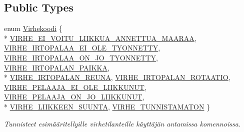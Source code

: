 \subsection*{Public Types}
\begin{DoxyCompactItemize}
\item 
enum \hyperlink{class_julkinen_1_1_toimintovirhe_a5b3c981a2e64a397ac982787bf310a2c}{Virhekoodi} \{ \\*
\hyperlink{class_julkinen_1_1_toimintovirhe_a5b3c981a2e64a397ac982787bf310a2ca4d1a26345955dbf92b867acd4a5f6e2d}{V\+I\+R\+H\+E\+\_\+\+E\+I\+\_\+\+V\+O\+I\+T\+U\+\_\+\+L\+I\+I\+K\+K\+U\+A\+\_\+\+A\+N\+N\+E\+T\+T\+U\+A\+\_\+\+M\+A\+A\+R\+A\+A}, 
\hyperlink{class_julkinen_1_1_toimintovirhe_a5b3c981a2e64a397ac982787bf310a2ca45456cd1427a07218eccbccf06973be6}{V\+I\+R\+H\+E\+\_\+\+I\+R\+T\+O\+P\+A\+L\+A\+A\+\_\+\+E\+I\+\_\+\+O\+L\+E\+\_\+\+T\+Y\+O\+N\+N\+E\+T\+T\+Y}, 
\hyperlink{class_julkinen_1_1_toimintovirhe_a5b3c981a2e64a397ac982787bf310a2caa4d2e02b06370b32ac15c322ecdfa2df}{V\+I\+R\+H\+E\+\_\+\+I\+R\+T\+O\+P\+A\+L\+A\+A\+\_\+\+O\+N\+\_\+\+J\+O\+\_\+\+T\+Y\+O\+N\+N\+E\+T\+T\+Y}, 
\hyperlink{class_julkinen_1_1_toimintovirhe_a5b3c981a2e64a397ac982787bf310a2ca25224589eb72ebf8375e8b796df90076}{V\+I\+R\+H\+E\+\_\+\+I\+R\+T\+O\+P\+A\+L\+A\+N\+\_\+\+P\+A\+I\+K\+K\+A}, 
\\*
\hyperlink{class_julkinen_1_1_toimintovirhe_a5b3c981a2e64a397ac982787bf310a2caf2e94c361afcf56589dd6f2e0a05857f}{V\+I\+R\+H\+E\+\_\+\+I\+R\+T\+O\+P\+A\+L\+A\+N\+\_\+\+R\+E\+U\+N\+A}, 
\hyperlink{class_julkinen_1_1_toimintovirhe_a5b3c981a2e64a397ac982787bf310a2ca64c902858cd0180525a1b47484b02ada}{V\+I\+R\+H\+E\+\_\+\+I\+R\+T\+O\+P\+A\+L\+A\+N\+\_\+\+R\+O\+T\+A\+A\+T\+I\+O}, 
\hyperlink{class_julkinen_1_1_toimintovirhe_a5b3c981a2e64a397ac982787bf310a2ca6e2d5c8e69dded8f90c7bf8901d72954}{V\+I\+R\+H\+E\+\_\+\+P\+E\+L\+A\+A\+J\+A\+\_\+\+E\+I\+\_\+\+O\+L\+E\+\_\+\+L\+I\+I\+K\+K\+U\+N\+U\+T}, 
\hyperlink{class_julkinen_1_1_toimintovirhe_a5b3c981a2e64a397ac982787bf310a2caf39fe8b019e7a7df69f9b6a79c4c5eea}{V\+I\+R\+H\+E\+\_\+\+P\+E\+L\+A\+A\+J\+A\+\_\+\+O\+N\+\_\+\+J\+O\+\_\+\+L\+I\+I\+K\+K\+U\+N\+U\+T}, 
\\*
\hyperlink{class_julkinen_1_1_toimintovirhe_a5b3c981a2e64a397ac982787bf310a2caa8ac8eac530cd3a661136128f0cc29c9}{V\+I\+R\+H\+E\+\_\+\+L\+I\+I\+K\+K\+E\+E\+N\+\_\+\+S\+U\+U\+N\+T\+A}, 
\hyperlink{class_julkinen_1_1_toimintovirhe_a5b3c981a2e64a397ac982787bf310a2caf41493c1af9268a9664e59acdc200ff5}{V\+I\+R\+H\+E\+\_\+\+T\+U\+N\+N\+I\+S\+T\+A\+M\+A\+T\+O\+N}
 \}\begin{DoxyCompactList}\small\item\em Tunnisteet esimääritellyille virhetilanteille käyttäjän antamissa komennoissa. \end{DoxyCompactList}
\end{DoxyCompactItemize}
